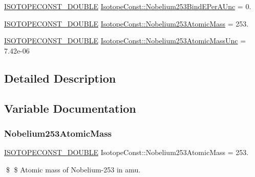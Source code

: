 \begin{DoxyCompactItemize}
\mbox{\hyperlink{group___isotope_const-_macros_ga8f45a7272ce02c0b4c65c44636ed719a}{I\+S\+O\+T\+O\+P\+E\+C\+O\+N\+S\+T\+\_\+\+D\+O\+U\+B\+LE}} \mbox{\hyperlink{group___isotope_const-_nobelium-_no253_ga6488928c1a7736d814a3941de054f669}{Isotope\+Const\+::\+Nobelium253\+Bind\+E\+Per\+A\+Unc}} = 0.
\item 
\mbox{\hyperlink{group___isotope_const-_macros_ga8f45a7272ce02c0b4c65c44636ed719a}{I\+S\+O\+T\+O\+P\+E\+C\+O\+N\+S\+T\+\_\+\+D\+O\+U\+B\+LE}} \mbox{\hyperlink{group___isotope_const-_nobelium-_no253_ga05dbe6b1bd0a8039aa5a2711cf4a3bad}{Isotope\+Const\+::\+Nobelium253\+Atomic\+Mass}} = 253.
\item 
\mbox{\hyperlink{group___isotope_const-_macros_ga8f45a7272ce02c0b4c65c44636ed719a}{I\+S\+O\+T\+O\+P\+E\+C\+O\+N\+S\+T\+\_\+\+D\+O\+U\+B\+LE}} \mbox{\hyperlink{group___isotope_const-_nobelium-_no253_ga02fe98547e55a5a20efb09dd4b364cd2}{Isotope\+Const\+::\+Nobelium253\+Atomic\+Mass\+Unc}} = 7.\+42e-\/06
\end{DoxyCompactItemize}


\subsection{Detailed Description}


\subsection{Variable Documentation}
\mbox{\label{group___isotope_const-_nobelium-_no253_ga05dbe6b1bd0a8039aa5a2711cf4a3bad}} 
\subsubsection{\texorpdfstring{Nobelium253\+Atomic\+Mass}{Nobelium253AtomicMass}}
{\footnotesize\ttfamily \mbox{\hyperlink{group___isotope_const-_macros_ga8f45a7272ce02c0b4c65c44636ed719a}{I\+S\+O\+T\+O\+P\+E\+C\+O\+N\+S\+T\+\_\+\+D\+O\+U\+B\+LE}} Isotope\+Const\+::\+Nobelium253\+Atomic\+Mass = 253.}

\$ \$ Atomic mass of Nobelium-\/253 in amu. \mbox{\label{group___isotope_const-_nobelium-_no253_ga02fe98547e55a5a20efb09dd4b364cd2}} 
